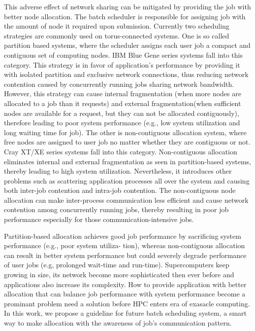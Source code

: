 \documentclass[conference]{IEEEtran}
\begin{document}
This adverse effect of network sharing can be mitigated by providing the job with better node allocation. The batch scheduler is responsible for assigning job with the amount of node it required upon submission. Currently two scheduling strategies are commonly used on torus-connected systems. One is so called partition based systems, where the scheduler assigns each user job a compact and contiguous set of computing nodes. IBM Blue Gene series systems fall into this category. This strategy is in favor of application’s performance by providing it with isolated partition and exclusive network connections, thus reducing network contention caused by concurrently running jobs sharing network bandwidth. However, this strategy can cause internal fragmentation (when more nodes are allocated to a job than it requests) and external fragmentation(when sufficient nodes are available for a request, but they can not be allocated contiguously), therefore leading to poor system performance (e.g., low system utilization and long waiting time for job). The other is non-contiguous allocation system, where free nodes are assigned to user job no matter whether they are contiguous or not. Cray XT/XE series systems fall into this category. Non-contiguous allocation eliminates internal and external fragmentation as seen in partition-based systems, thereby leading to high system utilization. Nevertheless, it introduces other problems such as scattering application processes all over the system and causing both inter-job contention and intra-job contention. The non-contiguous node allocation can make inter-process communication less efficient and cause network contention among concurrently running jobs, thereby resulting in poor job performance especially for those communication-intensive jobs.


Partition-based allocation achieves good job performance by sacrificing system performance (e.g., poor system utiliza- tion), whereas non-contiguous allocation can result in better system performance but could severely degrade performance of user jobs (e.g, prolonged wait-time and run-time). Supercomputers keep growing in size, its network become more sophisticated then ever before and applications also increase its complexity. How to provide application with better allocation that can balance job performance with system performance become a prominant problem need a solution before HPC enters era of exasacle computing. In this work, we propose a guideline for future batch scheduling system, a smart way to make allocation with the awareness of job's communication pattern.
\end{document}
